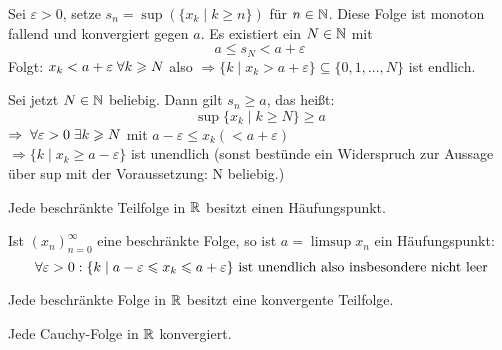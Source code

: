 \documentclass[main.tex]{subfiles}
\begin{document}
\begin{Beweis}
  \item Sei $\varepsilon > 0$, setze $s_n = \sup (\{ x_k \mid k \geq n \})$ für $n \in \mathbb{N}$. Diese Folge ist monoton fallend und konvergiert gegen $a$. Es existiert ein $N \in \mathbb{N}$ mit
    $$a \leq s_N < a + \varepsilon$$
    Folgt: $x_k < a + \varepsilon\;\forall k \geqslant N$ also $\Rightarrow \{k \mid x_k > a + \varepsilon \} \subseteq \{0,1,...,N\}$ ist endlich.
  \item Sei jetzt $N \in \mathbb{N}$ beliebig. Dann gilt $s_n \geq a$, das heißt:
    $$\sup \{x_k \mid k \geq N \} \geq a$$
    $\Rightarrow \;\forall \varepsilon > 0 \;\exists k \geqslant N$ mit $a-\varepsilon \leq x_k (< a+ \varepsilon)$\\
    $\Rightarrow \{k \mid x_k \geq a - \varepsilon \}$ ist unendlich (sonst bestünde ein Widerspruch zur Aussage über sup mit der Voraussetzung: N beliebig.)
\end{Beweis}

\begin{Korollar}
  Jede beschränkte Teilfolge in $\mathbb{R}$ besitzt einen Häufungspunkt.
\end{Korollar}

\begin{Beweis}
  Ist $(x_n)_{n=0}^\infty$ eine beschränkte Folge, so ist $a = \limsup x_n$ ein Häufungspunkt:
  $$\;\forall \varepsilon > 0 : \{k \mid a - \varepsilon \leqslant x_k \leqslant a + \varepsilon \} \text{ ist unendlich also insbesondere nicht leer}$$
\end{Beweis}

\begin{Korollar}
  Jede beschränkte Folge in $\mathbb{R}$ besitzt eine konvergente Teilfolge.
\end{Korollar}

\begin{Theorem}
  Jede Cauchy-Folge in $\mathbb{R}$ konvergiert.
\end{Theorem}
\end{document}
